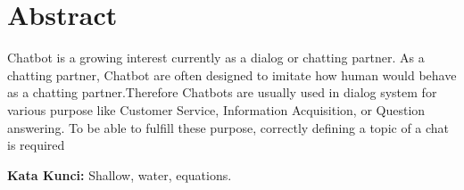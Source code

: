 \chapter*{Abstract}

 Chatbot is a growing interest currently as a dialog or chatting partner. As a chatting partner, Chatbot are often designed to imitate how human would behave as a chatting partner.Therefore Chatbots are usually used in dialog system for various purpose like Customer Service, Information Acquisition, or Question answering. To be able to fulfill these purpose, correctly defining a topic    of a chat is required
  
\vspace{0.5 cm}
\begin{flushleft}
{\textbf{Kata Kunci:} Shallow, water, equations.}
\end{flushleft}
